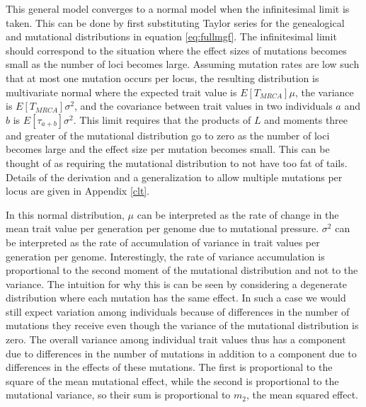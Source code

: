 This general model converges to a normal model when the infinitesimal limit is
taken. This can be done by first substituting Taylor series for the genealogical
and mutational distributions in equation \eqref{eq:fullmgf}. The infinitesimal
limit should correspond to the situation where the effect sizes of mutations
becomes small as the number of loci becomes large. Assuming mutation rates are
low such that at most one mutation occurs per locus, the resulting distribution
is multivariate normal where the expected trait value is $E[T_{MRCA}] \mu$, the
variance is $E[T_{MRCA}]\sigma^2$, and the covariance between trait values in
two individuals $a$ and $b$ is $E[\tau_{a+b}] \sigma^2$. This limit requires
that the products of $L$ and moments three and greater of the mutational
distribution go to zero as the number of loci becomes large and the effect size
per mutation becomes small. This can be thought of as requiring the mutational
distribution to not have too fat of tails. Details of the derivation and a
generalization to allow multiple mutations per locus are given in
Appendix \ref{clt}.

In this normal distribution, $\mu$ can be interpreted as the rate of change in
the mean trait value per generation per genome due to mutational pressure.
$\sigma^2$ can be interpreted as the rate of accumulation of variance in trait
values per generation per genome. Interestingly, the rate of variance
accumulation is proportional to the second moment of the mutational distribution
and not to the variance. The intuition for why this is can be seen by
considering a degenerate distribution where each mutation has the same effect.
In such a case we would still expect variation among individuals because of
differences in the number of mutations they receive even though the variance of
the mutational distribution is zero. The overall variance among individual trait
values thus has a component due to differences in the number of mutations in
addition to a component due to differences in the effects of these mutations.
The first is proportional to the square of the mean mutational effect, while the
second is proportional to the mutational variance, so their sum is proportional
to $m_2$, the mean squared effect. 

